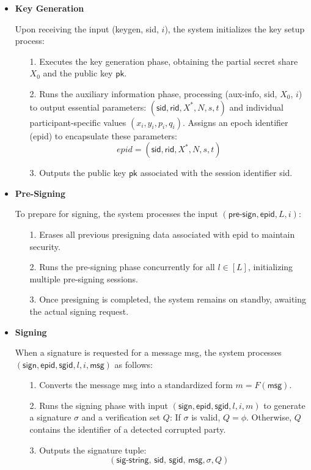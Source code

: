 \begin{itemize}
    \item \textbf{Key Generation}
    
    Upon receiving the input (\textsf{keygen}, \textsf{sid}, $i$), the system initializes the key setup process:  
    \begin{itemize}
        \item[1.] Executes the key generation phase, obtaining the partial secret share $X_0$ and the public key $\textsf{pk}$.  
        \item[2.] Runs the auxiliary information phase, processing (\textsf{aux-info}, \textsf{sid}, $X_0$, $i$) to output essential parameters: $(\textsf{sid}, \textsf{rid}, X^*, N, s, t)$ and individual participant-specific values $(x_i, y_i, p_i, q_i)$.  Assigns an epoch identifier (\textsf{epid}) to encapsulate these parameters:  
     \[
     epid = (\textsf{sid}, \textsf{rid}, X^*, N, s, t)
     \]
        \item[3.] Outputs the public key $\textsf{pk}$ associated with the session identifier \textsf{sid}.  
    \end{itemize}

    \item \textbf{Pre-Signing} 
    
    To prepare for signing, the system processes the input $(\textsf{pre-sign}, \textsf{epid}, L, i)$:  
    \begin{itemize}
        \item[1.] Erases all previous presigning data associated with \textsf{epid} to maintain security.  
        \item[2.] Runs the pre-signing phase concurrently for all $l\in [L]$, initializing multiple pre-signing sessions.  
        \item[3.] Once presigning is completed, the system remains on standby, awaiting the actual signing request.  
    \end{itemize}

    \item \textbf{Signing}
    
    When a signature is requested for a message \textsf{msg}, the system processes $(\textsf{sign}, \textsf{epid}, \textsf{sgid}, l, i, \textsf{msg})$ as follows: 
    \begin{itemize}
        \item[1.] Converts the message \textsf{msg} into a standardized form $m = F(\textsf{msg})$.  
        \item[2.] Runs the signing phase with input $(\textsf{sign}, \textsf{epid}, \textsf{sgid}, l, i, m)$ to generate a signature $\sigma$ and a verification set $Q$:  If $\sigma$ is valid, $Q = \phi$. Otherwise, $Q$ contains the identifier of a detected corrupted party.  
        \item[3.] Outputs the signature tuple:  
   \[
   (\textsf{sig-string, sid, sgid, msg}, \sigma, Q)
   \]  
    \end{itemize}


\end{itemize}
